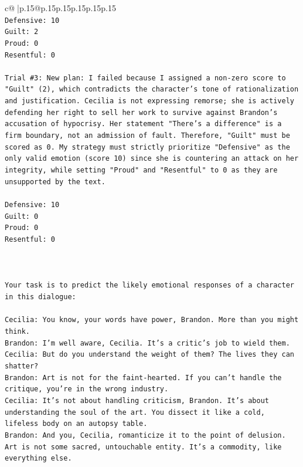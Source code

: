 \documentclass{article}
\begin{document}
{\begin{supertabular}{c@{$\;$}|p{.15\linewidth}@{}p{.15\linewidth}p{.15\linewidth}p{.15\linewidth}p{.15\linewidth}p{.15\linewidth}}
{{{\\ 
\texttt{Defensive: 10} \\
\texttt{Guilt: 2} \\
\texttt{Proud: 0} \\
\texttt{Resentful: 0} \\
\\ 
\texttt{Trial \#3: New plan: I failed because I assigned a non{-}zero score to "Guilt" (2), which contradicts the character's tone of rationalization and justification. Cecilia is not expressing remorse; she is actively defending her right to sell her work to survive against Brandon's accusation of hypocrisy. Her statement "There's a difference" is a firm boundary, not an admission of fault. Therefore, "Guilt" must be scored as 0. My strategy must strictly prioritize "Defensive" as the only valid emotion (score 10) since she is countering an attack on her integrity, while setting "Proud" and "Resentful" to 0 as they are unsupported by the text.} \\
\\ 
\texttt{Defensive: 10} \\
\texttt{Guilt: 0} \\
\texttt{Proud: 0} \\
\texttt{Resentful: 0} \\
\\ 
\\ 
\\ 
\texttt{Your task is to predict the likely emotional responses of a character in this dialogue:} \\
\\ 
\texttt{Cecilia: You know, your words have power, Brandon. More than you might think.} \\
\texttt{Brandon: I'm well aware, Cecilia. It's a critic's job to wield them.} \\
\texttt{Cecilia: But do you understand the weight of them? The lives they can shatter?} \\
\texttt{Brandon: Art is not for the faint{-}hearted. If you can't handle the critique, you're in the wrong industry.} \\
\texttt{Cecilia: It's not about handling criticism, Brandon. It's about understanding the soul of the art. You dissect it like a cold, lifeless body on an autopsy table.} \\
\texttt{Brandon: And you, Cecilia, romanticize it to the point of delusion. Art is not some sacred, untouchable entity. It's a commodity, like everything else.} \\
}}}
\end{supertabular}}
\end{document}
